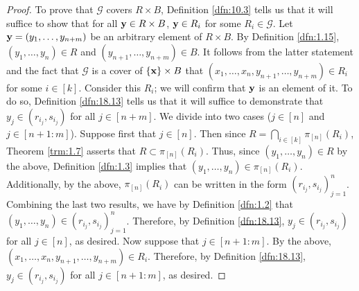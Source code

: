 \documentclass[../main.tex]{subfiles}
\begin{document}
\begin{lemma}
\begin{proof}
        To prove that $\mathcal{G}$ covers $R\times B$, Definition \ref{dfn:10.3} tells us that it will suffice to show that for all $\mathbf{y}\in R\times B$, $\mathbf{y}\in R_i$ for some $R_i\in\mathcal{G}$. Let $\mathbf{y}=(y_1,\dots,y_{n+m})$ be an arbitrary element of $R\times B$. By Definition \ref{dfn:1.15}, $(y_1,\dots,y_n)\in R$ and $(y_{n+1},\dots,y_{n+m})\in B$. It follows from the latter statement and the fact that $\mathcal{G}$ is a cover of $\{\mathbf{x}\}\times B$ that $(x_1,\dots,x_n,y_{n+1},\dots,y_{n+m})\in R_i$ for some $i\in[k]$. Consider this $R_i$; we will confirm that $\mathbf{y}$ is an element of it. To do so, Definition \ref{dfn:18.13} tells us that it will suffice to demonstrate that $y_j\in(r_{i_j},s_{i_j})$ for all $j\in[n+m]$. We divide into two cases ($j\in[n]$ and $j\in[n+1:m]$). Suppose first that $j\in[n]$. Then since $R=\bigcap_{i\in[k]}\pi_{[n]}(R_i)$, Theorem \ref{trm:1.7} asserts that $R\subset\pi_{[n]}(R_i)$. Thus, since $(y_1,\dots,y_n)\in R$ by the above, Definition \ref{dfn:1.3} implies that $(y_1,\dots,y_n)\in\pi_{[n]}(R_i)$. Additionally, by the above, $\pi_{[n]}(R_i)$ can be written in the form $(r_{i_j},s_{i_j})_{j=1}^n$. Combining the last two results, we have by Definition \ref{dfn:1.2} that $(y_1,\dots,y_n)\in(r_{i_j},s_{i_j})_{j=1}^n$. Therefore, by Definition \ref{dfn:18.13}, $y_j\in(r_{i_j},s_{i_j})$ for all $j\in[n]$, as desired. Now suppose that $j\in[n+1:m]$. By the above, $(x_1,\dots,x_n,y_{n+1},\dots,y_{n+m})\in R_i$. Therefore, by Definition \ref{dfn:18.13}, $y_j\in(r_{i_j},s_{i_j})$ for all $j\in[n+1:m]$, as desired.
    \end{proof}
\end{lemma}
\end{document}
